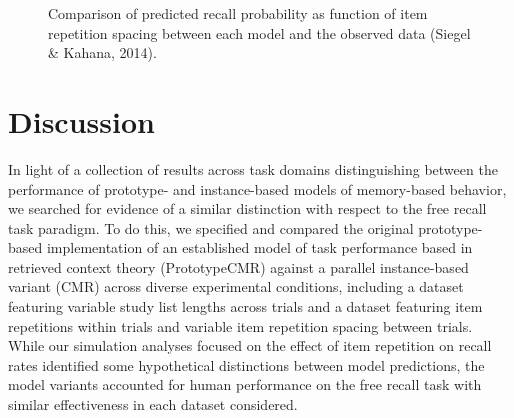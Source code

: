 \documentclass[
  letterpaper,
  DIV=11,
  numbers=noendperiod]{scrreport}
\begin{document}
\begin{figure}
\begin{minipage}[t]{0.33\linewidth}
{\centering 


}

\end{minipage}%

\caption{\label{fig-lohnas_spacing}Comparison of predicted recall
probability as function of item repetition spacing between each model
and the observed data (Siegel \& Kahana, 2014).}

\end{figure}


\hypertarget{discussion}{%
\chapter{Discussion}\label{discussion}}

In light of a collection of results across task domains distinguishing
between the performance of prototype- and instance-based models of
memory-based behavior, we searched for evidence of a similar distinction
with respect to the free recall task paradigm. To do this, we specified
and compared the original prototype-based implementation of an
established model of task performance based in retrieved context theory
(PrototypeCMR) against a parallel instance-based variant (CMR) across
diverse experimental conditions, including a dataset featuring variable
study list lengths across trials and a dataset featuring item
repetitions within trials and variable item repetition spacing between
trials. While our simulation analyses focused on the effect of item
repetition on recall rates identified some hypothetical distinctions
between model predictions, the model variants accounted for human
performance on the free recall task with similar effectiveness in each
dataset considered.
\end{document}
